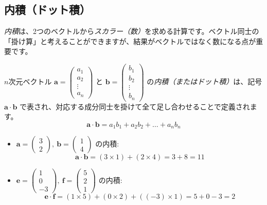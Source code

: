\subsection{内積（ドット積）}

\emph{内積}は、2つのベクトルから\emph{スカラー（数）}を求める計算です。ベクトル同士の「掛け算」と考えることができますが、結果がベクトルではなく数になる点が重要です。

\begin{dfn}[内積 - 成分による計算] \label{inner_product}
$n$次元ベクトル $\bm{a} = \begin{pmatrix} a_1 \\ a_2 \\ \vdots \\ a_n \end{pmatrix}$ と $\bm{b} = \begin{pmatrix} b_1 \\ b_2 \\ \vdots \\ b_n \end{pmatrix}$ の\emph{内積（またはドット積）}は、記号 $\bm{a} \cdot \bm{b}$ で表され、対応する成分同士を掛けて全て足し合わせることで定義されます。
\[\bm{a} \cdot \bm{b} = a_1 b_1 + a_2 b_2 + \dots + a_n b_n\]
\end{dfn}

\begin{ex}
\begin{itemize}
\item $\bm{a} = \begin{pmatrix} 3 \\ 2 \end{pmatrix},\ \bm{b} = \begin{pmatrix} 1 \\ 4 \end{pmatrix}$ の内積:
    \[\bm{a} \cdot \bm{b} = (3 \times 1) + (2 \times 4) = 3 + 8 = 11\]
\item $\bm{e} = \begin{pmatrix} 1 \\ 0 \\ -3 \end{pmatrix},\ \bm{f} = \begin{pmatrix} 5 \\ 2 \\ 1 \end{pmatrix}$ の内積:
    \[\bm{e} \cdot \bm{f} = (1 \times 5) + (0 \times 2) + ((-3) \times 1) = 5 + 0 - 3 = 2\]
\end{itemize}
\end{ex}

